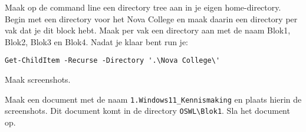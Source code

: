Maak op de command line een directory tree aan in je eigen home-directory. Begin met een directory voor het Nova College en maak daarin een directory per vak dat je dit block hebt. Maak per vak een directory aan met de naam Blok1, Blok2, Blok3 en Blok4. Nadat je klaar bent run je:
\begin{lstlisting}[style=DOS]
Get-ChildItem -Recurse -Directory '.\Nova College\'
\end{lstlisting}

Maak screenshots.

Maak een document met de naam \texttt{1.\-Windows11\_\-Kennismaking} en plaats hierin de screenshots. Dit document komt in de directory \texttt{OSWL\textbackslash Blok1}. Sla het document op.


